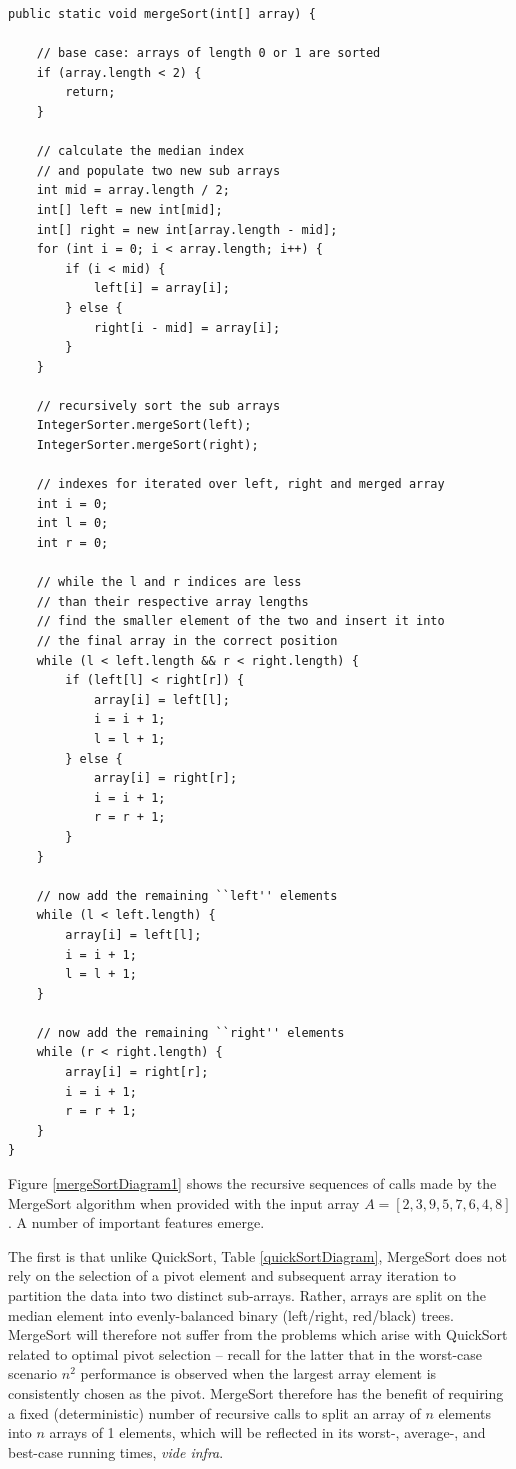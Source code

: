 \documentclass[12pt,a4paper]{article}
\begin{document}
\begin{lstlisting}[caption={MergeSort algorithm adadapted from \cite{mergeSortEducative} and implemented in the current project.},captionpos=b, label={mergeSortSource}]
public static void mergeSort(int[] array) {

	// base case: arrays of length 0 or 1 are sorted
	if (array.length < 2) {
		return;
	}

	// calculate the median index
	// and populate two new sub arrays
	int mid = array.length / 2;
	int[] left = new int[mid];
	int[] right = new int[array.length - mid];
	for (int i = 0; i < array.length; i++) {
		if (i < mid) {
			left[i] = array[i];
		} else {
			right[i - mid] = array[i];
		}
	}
	
	// recursively sort the sub arrays
	IntegerSorter.mergeSort(left);
	IntegerSorter.mergeSort(right);

	// indexes for iterated over left, right and merged array
	int i = 0;
	int l = 0;
	int r = 0;

	// while the l and r indices are less
	// than their respective array lengths
	// find the smaller element of the two and insert it into
	// the final array in the correct position
	while (l < left.length && r < right.length) {
		if (left[l] < right[r]) {
			array[i] = left[l];
			i = i + 1;
			l = l + 1;
		} else {
			array[i] = right[r];
			i = i + 1;
			r = r + 1;
		}
	}

	// now add the remaining ``left'' elements
	while (l < left.length) {
		array[i] = left[l];
		i = i + 1;
		l = l + 1;
	}

	// now add the remaining ``right'' elements
	while (r < right.length) {
		array[i] = right[r];
		i = i + 1;
		r = r + 1;
	}
}
\end{lstlisting}

Figure \ref{mergeSortDiagram1} shows the recursive sequences of calls made by the MergeSort algorithm when provided with the input array $A = [2,3,9,5,7,6,4,8]$. A number of important features emerge. 

The first is that unlike QuickSort, Table \ref{quickSortDiagram}, MergeSort does not rely on the selection of a pivot element and subsequent array iteration to partition the data into two distinct sub-arrays. Rather, arrays are split on the median element into evenly-balanced binary (left/right, red/black) trees. MergeSort will therefore not suffer from the problems which arise with QuickSort related to optimal pivot selection -- recall for the latter that in the worst-case scenario $n^2$ performance is observed when the largest array element is consistently chosen as the pivot. MergeSort therefore has the benefit of requiring a fixed (deterministic) number of recursive calls to split an array of $n$ elements into $n$ arrays of 1 elements, which will be reflected in its worst-, average-, and best-case running times, \emph{vide infra}.
\end{document}
